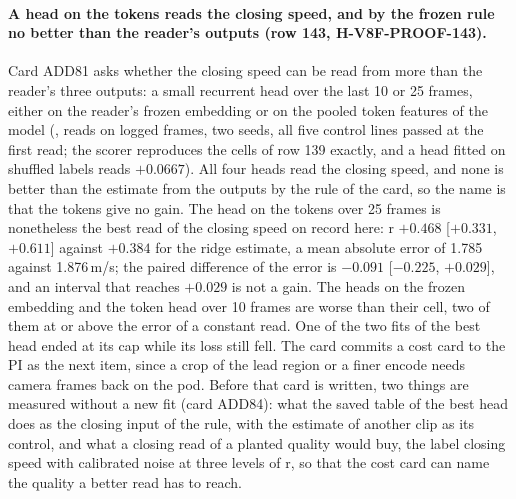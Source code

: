 \paragraph{A head on the tokens reads the closing speed, and by the frozen rule no better than the reader's outputs (row 143, H-V8F-PROOF-143).} Card ADD81 asks whether the closing speed can be read from more than the reader's three outputs: a small recurrent head over the last 10 or 25 frames, either on the reader's frozen embedding or on the pooled token features of the model (, reads on logged frames, two seeds, all five control lines passed at the first read; the scorer reproduces the cells of row 139 exactly, and a head fitted on shuffled labels reads $+0.0667$). All four heads read the closing speed, and none is better than the estimate from the outputs by the rule of the card, so the name is that the tokens give no gain. The head on the tokens over 25 frames is nonetheless the best read of the closing speed on record here: r $+0.468$ [$+0.331$, $+0.611$] against $+0.384$ for the ridge estimate, a mean absolute error of 1.785 against 1.876\,m/s; the paired difference of the error is $-0.091$ [$-0.225$, $+0.029$], and an interval that reaches $+0.029$ is not a gain. The heads on the frozen embedding and the token head over 10 frames are worse than their cell, two of them at or above the error of a constant read. One of the two fits of the best head ended at its cap while its loss still fell. The card commits a cost card to the PI as the next item, since a crop of the lead region or a finer encode needs camera frames back on the pod. Before that card is written, two things are measured without a new fit (card ADD84): what the saved table of the best head does as the closing input of the rule, with the estimate of another clip as its control, and what a closing read of a planted quality would buy, the label closing speed with calibrated noise at three levels of r, so that the cost card can name the quality a better read has to reach.


